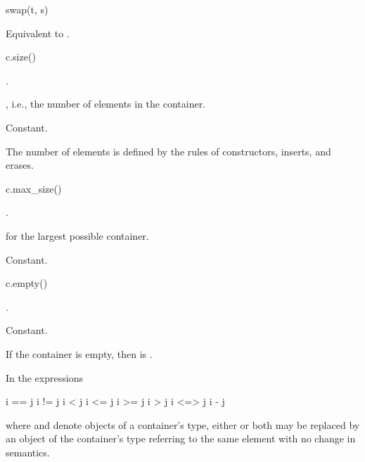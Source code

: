 \begin{itemdecl}
swap(t, s)
\end{itemdecl}

\begin{itemdescr}
\pnum
\effects
Equivalent to .
\end{itemdescr}

%
\begin{itemdecl}
c.size()
\end{itemdecl}

\begin{itemdescr}
\pnum
\result
{}.

\pnum
\returns
{},
i.e., the number of elements in the container.

\pnum
\complexity
Constant.

\pnum
\remarks
The number of elements is defined by the rules of
constructors, inserts, and erases.
\end{itemdescr}

%
\begin{itemdecl}
c.max_size()
\end{itemdecl}

\begin{itemdescr}
\pnum
\result
{}.

\pnum
\returns
{} for the largest possible container.

\pnum
\complexity
Constant.
\end{itemdescr}

%
\begin{itemdecl}
c.empty()
\end{itemdecl}

\begin{itemdescr}
\pnum
\result
{}.

\pnum
\returns
{}

\pnum
\complexity
Constant.

\pnum
\remarks
If the container is empty, then  is .
\end{itemdescr}

\pnum
In the expressions
\begin{codeblock}
i == j
i != j
i < j
i <= j
i >= j
i > j
i <=> j
i - j
\end{codeblock}
where  and  denote objects of a container's 
type, either or both may be replaced by an object of the container's
 type referring to the same element with no change in semantics.


